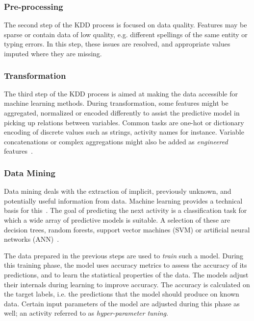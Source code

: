 \subsubsection*{Pre-processing}
The second step of the KDD process is focused on data quality. Features may be sparse or contain data of low quality, e.g. different spellings of the same entity or typing errors. In this step, these issues are resolved, and appropriate values imputed where they are missing.

\subsubsection*{Transformation}\label{sec:predictive-model-development:transformation}
The third step of the KDD process is aimed at making the data accessible for machine learning methods. During transformation, some features might be aggregated, normalized or encoded differently to assist the predictive model in picking up relations between variables. Common tasks are one-hot or dictionary encoding of discrete values such as strings, activity names for instance. Variable concatenations or complex aggregations might also be added as \textit{engineered} features~\cite{kuhn2013applied}.

\subsubsection*{Data Mining}
Data mining deals with the extraction of implicit, previously unknown, and potentially useful information from data. Machine learning provides a technical basis for this~\cite{Aalst2016}. The goal of predicting the next activity is a classification task for which a wide array of predictive models is suitable. A selection of these are decision trees, random forests, support vector machines (SVM) or artificial neural networks (ANN)~\cite{kuhn2013applied}.

The data prepared in the previous steps are used to \textit{train} such a model. During this training phase, the model uses accuracy metrics to assess the accuracy of its predictions, and to learn the statistical properties of the data. The models adjust their internals during learning to improve accuracy. The accuracy is calculated on the target labels, i.e. the predictions that the model should produce on known data.
Certain input parameters of the model are adjusted during this phase as well; an activity referred to as \textit{hyper-parameter tuning}.

